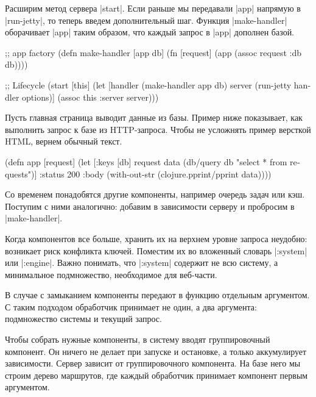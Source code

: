Расширим метод сервера \spverb|start|. Если раньше мы передавали \spverb|app|
напрямую в \spverb|run-jetty|, то теперь введем дополнительный шаг. Функция
\spverb|make-handler| оборачивает \spverb|app| таким образом, что каждый запрос
в \spverb|app| дополнен базой.

\begin{english}
  \begin{clojure}
;; app factory
(defn make-handler [app db]
  (fn [request]
    (app (assoc request :db db))))

;; Lifecycle
(start [this]
  (let [handler (make-handler app db)
        server (run-jetty handler options)]
    (assoc this :server server)))
  \end{clojure}
\end{english}

Пусть главная страница выводит данные из базы. Пример ниже показывает, как
выполнить запрос к базе из HTTP-запроса. Чтобы не усложнять пример версткой
HTML, вернем обычный текст.

\begin{english}
  \begin{clojure}
(defn app [request]
  (let [{:keys [db]} request
        data (db/query db "select * from requests")]
    {:status 200
     :body (with-out-str
             (clojure.pprint/pprint data))}))
  \end{clojure}
\end{english}

Со временем понадобятся другие компоненты, например очередь задач или
кэш. Поступим с ними аналогично: добавим в зависимости серверу и пробросим в
\spverb|make-handler|.

Когда компонентов все больше, хранить их на верхнем уровне запроса неудобно:
возникает риск конфликта ключей. Поместим их во вложенный словарь
\spverb|:system| или \spverb|:engine|. Важно понимать, что \spverb|:system|
содержит не всю систему, а минимальное подмножество, необходимое для веб-части.

В случае с замыканием компоненты передают в функцию отдельным аргументом. С
таким подходом обработчик принимает не один, а два аргумента: подмножество
системы и текущий запрос.

Чтобы собрать нужные компоненты, в систему вводят группировочный компонент. Он
ничего не делает при запуске и остановке, а только аккумулирует
зависимости. Сервер зависит от группировочного компонента. На базе него мы
строим дерево маршрутов, где каждый обработчик принимает компонент первым
аргументом.

